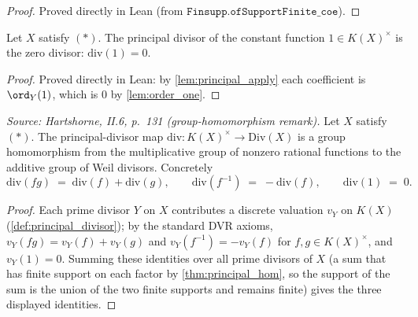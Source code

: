 \begin{proof}
  Proved directly in Lean (from \(\texttt{Finsupp.ofSupportFinite\_coe}\)).
\end{proof}
\begin{lemma}

  \label{lem:principal_one}
  Let \(X\) satisfy \((*)\). The principal divisor of the constant function
  \(1 \in K(X)^{\times}\) is the zero divisor: \(\mathrm{div}(1) = 0\).
\end{lemma}
\begin{proof}
  Proved directly in Lean: by \ref{lem:principal_apply} each coefficient is
  \(\ord_Y(1)\), which is \(0\) by \ref{lem:order_one}.
\end{proof}
\begin{theorem}
  \label{thm:principal_hom}
  \textit{Source: Hartshorne, II.6, p.~131 (group-homomorphism remark).}
  Let \(X\) satisfy \((*)\). The principal-divisor map
  \(\mathrm{div} \colon K(X)^{\times} \to \mathrm{Div}(X)\) is a group homomorphism from the
  multiplicative group of nonzero rational functions to the additive group
  of Weil divisors. Concretely
  \[
    \mathrm{div}(fg) \;=\; \mathrm{div}(f) + \mathrm{div}(g),
    \qquad
    \mathrm{div}(f^{-1}) \;=\; -\mathrm{div}(f),
    \qquad
    \mathrm{div}(1) \;=\; 0.
  \]
\end{theorem}
\begin{proof}
  Each prime divisor \(Y\) on \(X\) contributes a discrete valuation \(v_Y\) on
  \(K(X)\) (\ref{def:principal_divisor}); by the standard DVR axioms,
  \(v_Y(fg) = v_Y(f) + v_Y(g)\) and \(v_Y(f^{-1}) = -v_Y(f)\) for $f, g \in
  K(X)^{\times}$, and $v_Y(1) = 0$. Summing these identities over all prime
  divisors of \(X\) (a sum that has finite support on each factor by
  \ref{thm:principal_hom}, so the support of the sum is the union
  of the two finite supports and remains finite) gives the three displayed
  identities.
\end{proof}
